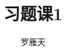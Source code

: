 \documentclass[12pt]{article}
\newcommand{\hei}{\CJKfamily{hei}}                          %
\begin{document}
\author{罗雁天}
\title{习题课1}
\maketitle

\medskip

\begin{enumerate}



\end{enumerate}
\end{document}

